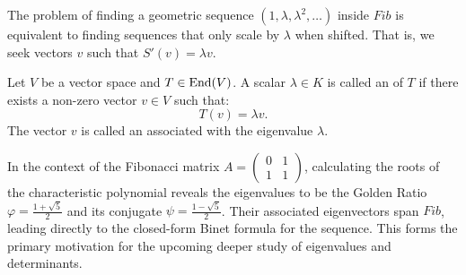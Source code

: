 The problem of finding a geometric sequence $(1, \lambda, \lambda^2, \dots)$ inside $Fib$ is equivalent to finding sequences that only scale by $\lambda$ when shifted. That is, we seek vectors $v$ such that $S'(v) = \lambda v$.

\begin{definition}
  Let $V$ be a vector space and $T \in \operatorname{End}(V)$. A scalar $\lambda \in K$ is called an  of $T$ if there exists a non-zero vector $v \in V$ such that:
  \[ T(v) = \lambda v. \]
  The vector $v$ is called an  associated with the eigenvalue $\lambda$.
\end{definition}

In the context of the Fibonacci matrix $A = \left(\begin{smallmatrix} 0 & 1 \\ 1 & 1 \end{smallmatrix}\right)$, calculating the roots of the characteristic polynomial reveals the eigenvalues to be the Golden Ratio $\varphi = \frac{1+\sqrt{5}}{2}$ and its conjugate $\psi = \frac{1-\sqrt{5}}{2}$. Their associated eigenvectors span $Fib$, leading directly to the closed-form Binet formula for the sequence. This forms the primary motivation for the upcoming deeper study of eigenvalues and determinants.